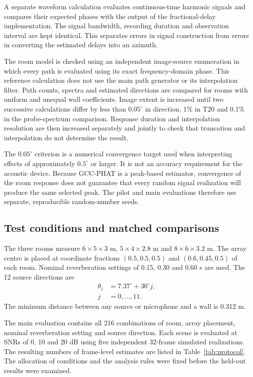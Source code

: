 \documentclass{edpsci}
\begin{document}
A separate waveform calculation evaluates continuous-time harmonic signals and compares their expected phases with the output of the fractional-delay implementation. The signal bandwidth, recording duration and observation interval are kept identical. This separates errors in signal construction from errors in converting the estimated delays into an azimuth.

The room model is checked using an independent image-source enumeration in which every path is evaluated using its exact frequency-domain phase. This reference calculation does not use the main path generator or its interpolation filter. Path counts, spectra and estimated directions are compared for rooms with uniform and unequal wall coefficients. Image extent is increased until two successive calculations differ by less than $0.05^\circ$ in direction, 1\% in T20 and 0.1\% in the probe-spectrum comparison. Response duration and interpolation resolution are then increased separately and jointly to check that truncation and interpolation do not determine the result.

The $0.05^\circ$ criterion is a numerical convergence target used when interpreting effects of approximately $0.5^\circ$ or larger. It is not an accuracy requirement for the acoustic device. Because GCC-PHAT is a peak-based estimator, convergence of the room response does not guarantee that every random signal realization will produce the same selected peak. The pilot and main evaluations therefore use separate, reproducible random-number seeds.

\subsection{Test conditions and matched comparisons}

The three rooms measure $6\times5\times3$ m, $5\times4\times2.8$ m and $8\times6\times3.2$ m. The array centre is placed at coordinate fractions $(0.5,0.5,0.5)$ and $(0.6,0.45,0.5)$ of each room. Nominal reverberation settings of 0.15, 0.30 and 0.60 s are used. The 12 source directions are
\begin{equation}
	\begin{aligned}
		\theta_j &= 7.37^\circ+30^\circ j,\\
		j &= 0,\ldots,11.
	\end{aligned}
\end{equation}
The minimum distance between any source or microphone and a wall is 0.312 m.

The main evaluation contains all 216 combinations of room, array placement, nominal reverberation setting and source direction. Each scene is evaluated at SNRs of 0, 10 and 20 dB using five independent 32-frame simulated realizations. The resulting numbers of frame-level estimates are listed in Table~\ref{tab:protocol}. The allocation of conditions and the analysis rules were fixed before the held-out results were examined.
\end{document}
